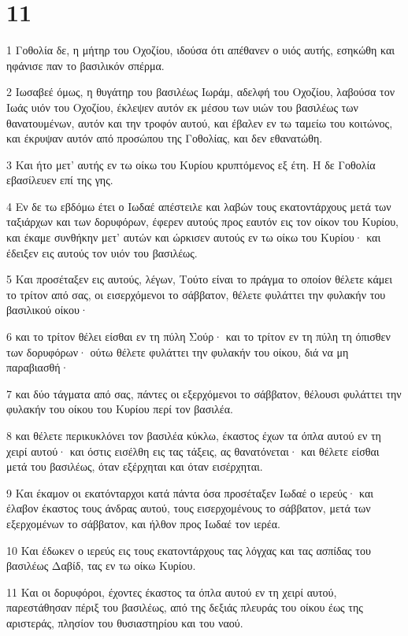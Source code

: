 \chapter{11}

\par 1 Γοθολία δε, η μήτηρ του Οχοζίου, ιδούσα ότι απέθανεν ο υιός αυτής, εσηκώθη και ηφάνισε παν το βασιλικόν σπέρμα.
\par 2 Ιωσαβεέ όμως, η θυγάτηρ του βασιλέως Ιωράμ, αδελφή του Οχοζίου, λαβούσα τον Ιωάς υιόν του Οχοζίου, έκλεψεν αυτόν εκ μέσου των υιών του βασιλέως των θανατουμένων, αυτόν και την τροφόν αυτού, και έβαλεν εν τω ταμείω του κοιτώνος, και έκρυψαν αυτόν από προσώπου της Γοθολίας, και δεν εθανατώθη.
\par 3 Και ήτο μετ' αυτής εν τω οίκω του Κυρίου κρυπτόμενος εξ έτη. Η δε Γοθολία εβασίλευεν επί της γης.
\par 4 Εν δε τω εβδόμω έτει ο Ιωδαέ απέστειλε και λαβών τους εκατοντάρχους μετά των ταξιάρχων και των δορυφόρων, έφερεν αυτούς προς εαυτόν εις τον οίκον του Κυρίου, και έκαμε συνθήκην μετ' αυτών και ώρκισεν αυτούς εν τω οίκω του Κυρίου· και έδειξεν εις αυτούς τον υιόν του βασιλέως.
\par 5 Και προσέταξεν εις αυτούς, λέγων, Τούτο είναι το πράγμα το οποίον θέλετε κάμει το τρίτον από σας, οι εισερχόμενοι το σάββατον, θέλετε φυλάττει την φυλακήν του βασιλικού οίκου·
\par 6 και το τρίτον θέλει είσθαι εν τη πύλη Σούρ· και το τρίτον εν τη πύλη τη όπισθεν των δορυφόρων· ούτω θέλετε φυλάττει την φυλακήν του οίκου, διά να μη παραβιασθή·
\par 7 και δύο τάγματα από σας, πάντες οι εξερχόμενοι το σάββατον, θέλουσι φυλάττει την φυλακήν του οίκου του Κυρίου περί τον βασιλέα.
\par 8 και θέλετε περικυκλόνει τον βασιλέα κύκλω, έκαστος έχων τα όπλα αυτού εν τη χειρί αυτού· και όστις εισέλθη εις τας τάξεις, ας θανατόνεται· και θέλετε είσθαι μετά του βασιλέως, όταν εξέρχηται και όταν εισέρχηται.
\par 9 Και έκαμον οι εκατόνταρχοι κατά πάντα όσα προσέταξεν Ιωδαέ ο ιερεύς· και έλαβον έκαστος τους άνδρας αυτού, τους εισερχομένους το σάββατον, μετά των εξερχομένων το σάββατον, και ήλθον προς Ιωδαέ τον ιερέα.
\par 10 Και έδωκεν ο ιερεύς εις τους εκατοντάρχους τας λόγχας και τας ασπίδας του βασιλέως Δαβίδ, τας εν τω οίκω Κυρίου.
\par 11 Και οι δορυφόροι, έχοντες έκαστος τα όπλα αυτού εν τη χειρί αυτού, παρεστάθησαν πέριξ του βασιλέως, από της δεξιάς πλευράς του οίκου έως της αριστεράς, πλησίον του θυσιαστηρίου και του ναού.

